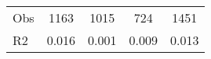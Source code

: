\begin{tabular}{l*{4}{c}}
\hline                                                                                                                                                                                                                                            
 Obs                   &               1163               &       1015                       &       724                &              1451                                               \\ 
 R2                    &                      0.016              &              0.001                      &              0.009               &                     0.013                                              \\ 
\hline \end{tabular}                                                                                                                                                                                                              